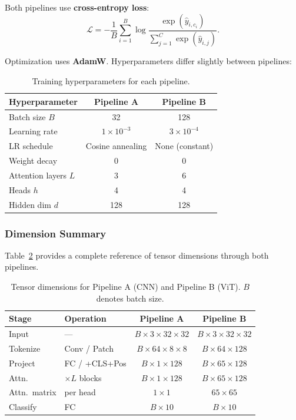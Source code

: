 \documentclass[12pt, a4paper]{article}
\begin{document}
Both pipelines use \textbf{cross-entropy loss}:
\begin{equation}
    \mathcal{L} = -\frac{1}{B}\sum_{i=1}^{B}
    \log\frac{\exp(\hat{y}_{i,c_i})}{\sum_{j=1}^{C}\exp(\hat{y}_{i,j})}.
    \label{eq:cross_entropy}
\end{equation}

Optimization uses \textbf{AdamW}. Hyperparameters differ slightly
between pipelines:

\begin{table}[H]
\centering
\caption{Training hyperparameters for each pipeline.}
\label{tab:hyperparams}
\begin{tabular}{@{}lcc@{}}
\toprule
\textbf{Hyperparameter} & \textbf{Pipeline A} & \textbf{Pipeline B} \\
\midrule
Batch size $B$       & 32                 & 128 \\
Learning rate        & $1 \times 10^{-3}$ & $3 \times 10^{-4}$ \\
LR schedule          & Cosine annealing   & None (constant) \\
Weight decay          & 0                  & 0 \\
Attention layers $L$ & 3                  & 6 \\
Heads $h$            & 4                  & 4 \\
Hidden dim $d$       & 128                & 128 \\
\bottomrule
\end{tabular}
\end{table}

\subsubsection{Dimension Summary}

Table~\ref{tab:dimensions} provides a complete reference of tensor
dimensions through both pipelines.

\begin{table}[H]
\centering
\caption{Tensor dimensions for Pipeline A (CNN) and Pipeline B (ViT).
$B$ denotes batch size.}
\label{tab:dimensions}
\begin{tabular}{@{}llcc@{}}
\toprule
\textbf{Stage} & \textbf{Operation}
    & \textbf{Pipeline A} & \textbf{Pipeline B} \\
\midrule
Input    & ---
    & $B{\times}3{\times}32{\times}32$ & $B{\times}3{\times}32{\times}32$ \\
Tokenize & Conv / Patch
    & $B{\times}64{\times}8{\times}8$ & $B{\times}64{\times}128$ \\
Project  & FC / +CLS+Pos
    & $B{\times}1{\times}128$ & $B{\times}65{\times}128$ \\
Attn.    & $\times L$ blocks
    & $B{\times}1{\times}128$ & $B{\times}65{\times}128$ \\
Attn.~matrix & per head
    & $1{\times}1$ & $65{\times}65$ \\
Classify & FC
    & $B{\times}10$ & $B{\times}10$ \\
\bottomrule
\end{tabular}
\end{table}
\end{document}
